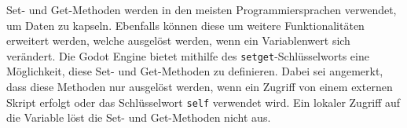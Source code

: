 
Set- und Get-Methoden werden in den meisten Programmiersprachen verwendet, um Daten zu kapseln. Ebenfalls können diese um weitere Funktionalitäten erweitert werden, welche ausgelöst werden, wenn ein Variablenwert sich verändert. Die Godot Engine bietet mithilfe des \texttt{setget}-Schlüsselworts eine Möglichkeit, diese Set- und Get-Methoden zu definieren. Dabei sei angemerkt, dass diese Methoden nur ausgelöst werden, wenn ein Zugriff von einem externen Skript erfolgt oder das Schlüsselwort \texttt{self} verwendet wird. Ein lokaler Zugriff auf die Variable löst die Set- und Get-Methoden nicht aus.